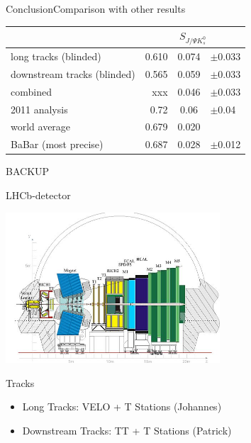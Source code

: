 \documentclass{beamer}
\newcommand{\SJPsi}{S_{J/\Psi K_s^0}}
\begin{document}
\begin{frame}{Conclusion}{Comparison with other results}
\begin{center}
\begin{tabular}{l r@{$\pm$}c@{}l}
\hline \hline
& \multicolumn{3}{c}{$\SJPsi$} \\ \hline
long tracks (blinded) & 0.610 & 0.074 &$\pm$0.033\\
downstream tracks (blinded) & 0.565 & 0.059 &$\pm$0.033\\ \hline
combined & xxx & 0.046&$\pm$0.033 \\ \hline
2011 analysis & 0.72 & 0.06 &$\pm$0.04\\
world average & 0.679 & 0.020 &\\
BaBar (most precise) & 0.687 & 0.028 &$\pm$0.012 \\ \hline \hline
\end{tabular}
\end{center}
\end{frame}

\begin{frame}
\begin{center}
BACKUP
\end{center}
\end{frame}

	
	\begin{frame}{LHCb-detector}
	\begin{center}
	\includegraphics[width = 0.6\textwidth]{detector}
	\end{center}
	\begin{block}{Tracks}
	\begin{itemize}
		\item Long Tracks: VELO + T Stations (Johannes)
		\item Downstream Tracks: TT + T Stations (Patrick)
	\end{itemize}
	\end{block}	
	\end{frame}
	
\end{document}

